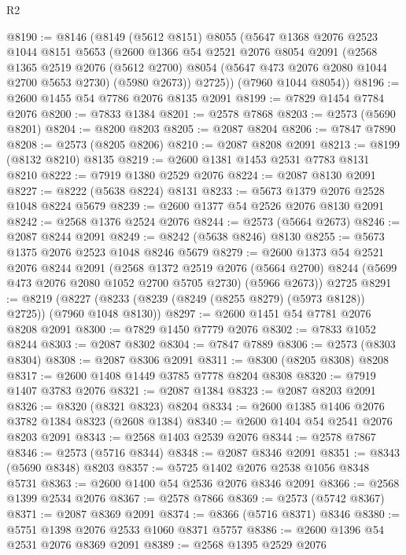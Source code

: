 \begin{lexlean}{R2}
\begin{coremodule}
@8190 := @8146
    (@8149
      (@5612 @8151)
      @8055
      (@5647
        @1368
        @2076
        @2523
        @1044
        @8151
        @5653
        (@2600
          @1366
          @54
          @2521
          @2076
          @8054
          @2091
          (@2568
            @1365
            @2519
            @2076
            (@5612 @2700)
            @8054
            (@5647 @473 @2076 @2080 @1044 @2700 @5653 @2730)
            (@5980 @2673))
          @2725))
      (@7960 @1044 @8054))
@8196 := @2600 @1455 @54 @7786 @2076 @8135 @2091
@8199 := @7829 @1454 @7784 @2076
@8200 := @7833 @1384
@8201 := @2578 @7868
@8203 := @2573 (@5690 @8201)
@8204 := @8200 @8203
@8205 := @2087 @8204
@8206 := @7847 @7890
@8208 := @2573 (@8205 @8206)
@8210 := @2087 @8208 @2091
@8213 := @8199 (@8132 @8210) @8135
@8219 := @2600 @1381 @1453 @2531 @7783 @8131 @8210
@8222 := @7919 @1380 @2529 @2076
@8224 := @2087 @8130 @2091
@8227 := @8222 (@5638 @8224) @8131
@8233 := @5673 @1379 @2076 @2528 @1048 @8224 @5679
@8239 := @2600 @1377 @54 @2526 @2076 @8130 @2091
@8242 := @2568 @1376 @2524 @2076
@8244 := @2573 (@5664 @2673)
@8246 := @2087 @8244 @2091
@8249 := @8242 (@5638 @8246) @8130
@8255 := @5673 @1375 @2076 @2523 @1048 @8246 @5679
@8279 := @2600
    @1373
    @54
    @2521
    @2076
    @8244
    @2091
    (@2568
      @1372
      @2519
      @2076
      (@5664 @2700)
      @8244
      (@5699 @473 @2076 @2080 @1052 @2700 @5705 @2730)
      (@5966 @2673))
    @2725
@8291 := @8219 (@8227 (@8233 (@8239 (@8249 (@8255 @8279) (@5973 @8128)) @2725)) (@7960 @1048 @8130))
@8297 := @2600 @1451 @54 @7781 @2076 @8208 @2091
@8300 := @7829 @1450 @7779 @2076
@8302 := @7833 @1052 @8244
@8303 := @2087 @8302
@8304 := @7847 @7889
@8306 := @2573 (@8303 @8304)
@8308 := @2087 @8306 @2091
@8311 := @8300 (@8205 @8308) @8208
@8317 := @2600 @1408 @1449 @3785 @7778 @8204 @8308
@8320 := @7919 @1407 @3783 @2076
@8321 := @2087 @1384
@8323 := @2087 @8203 @2091
@8326 := @8320 (@8321 @8323) @8204
@8334 := @2600 @1385 @1406 @2076 @3782 @1384 @8323 (@2608 @1384)
@8340 := @2600 @1404 @54 @2541 @2076 @8203 @2091
@8343 := @2568 @1403 @2539 @2076
@8344 := @2578 @7867
@8346 := @2573 (@5716 @8344)
@8348 := @2087 @8346 @2091
@8351 := @8343 (@5690 @8348) @8203
@8357 := @5725 @1402 @2076 @2538 @1056 @8348 @5731
@8363 := @2600 @1400 @54 @2536 @2076 @8346 @2091
@8366 := @2568 @1399 @2534 @2076
@8367 := @2578 @7866
@8369 := @2573 (@5742 @8367)
@8371 := @2087 @8369 @2091
@8374 := @8366 (@5716 @8371) @8346
@8380 := @5751 @1398 @2076 @2533 @1060 @8371 @5757
@8386 := @2600 @1396 @54 @2531 @2076 @8369 @2091
@8389 := @2568 @1395 @2529 @2076

\end{coremodule}
\end{lexlean}
